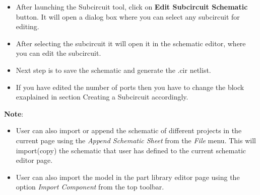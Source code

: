 \begin{itemize}
    \item After launching the Subcircuit tool, click on \textbf{Edit Subcircuit Schematic} button. It will open a dialog box where you can select any subcircuit for editing.
    \item After selecting the subcircuit it will open it in the schematic editor, where you can edit the subcircuit.
    \item Next step is to save the schematic and generate the .cir netlist.
    \item If you have edited the number of ports then you have to change the block exaplained in section {Creating a Subcircuit} accordingly.
\end {itemize}
    
{\textbf{Note}}:    
    
\begin{itemize}
\item User can also import or append the schematic of different projects in the current page using the \textit{Append Schematic Sheet} from the \textit{File} menu. This will import(copy) the schematic that user has defined to the current schematic editor page.
\item  User can also import the model in the part library editor page using the option \textit{Import Component} from the top toolbar.
\end{itemize}

